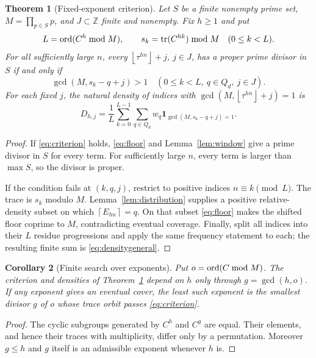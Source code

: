 \documentclass[11pt,a4paper]{article}
\newtheorem{theorem}{Theorem}[section]
\newtheorem{corollary}[theorem]{Corollary}
\theoremstyle{definition}\newtheorem{definition}[theorem]{Definition}
\theoremstyle{remark}\newtheorem{remark}[theorem]{Remark}
\newcommand{\Z}{\mathbb Z}\newcommand{\Q}{\mathbb Q}
\newcommand{\floor}[1]{\left\lfloor#1\right\rfloor}
\newcommand{\ceil}[1]{\left\lceil#1\right\rceil}
\newcommand{\ind}{\mathbf 1}
\begin{document}
\begin{theorem}[Fixed-exponent criterion]\label{thm:criterion}
Let $S$ be a finite nonempty prime set, $M=\prod_{p\in S}p$, and $J\subset\Z$ finite and nonempty. Fix $h\ge1$ and put
\[
 L=\operatorname{ord}(C^h\bmod M),\qquad
 s_k=\operatorname{tr}(C^{hk})\bmod M\quad(0\le k<L).
\]
For all sufficiently large $n$, every $\floor{\tau^{hn}}+j$, $j\in J$, has a proper prime divisor in $S$ if and only if
\begin{equation}\label{eq:criterion}
 \gcd(M,s_k-q+j)>1
 \quad(0\le k<L,\ q\in Q_d,\ j\in J).
\end{equation}
For each fixed $j$, the natural density of indices with
$\gcd(M,\floor{\tau^{hn}}+j)=1$ is
\begin{equation}\label{eq:densitygeneral}
 D_{h,j}=\frac1L\sum_{k=0}^{L-1}\sum_{q\in Q_d}
 w_q\ind_{\gcd(M,s_k-q+j)=1}.
\end{equation}
\end{theorem}
\begin{proof}
If \eqref{eq:criterion} holds, \eqref{eq:floor} and Lemma~\ref{lem:window} give a prime divisor in $S$ for every term. For sufficiently large $n$, every term is larger than $\max S$, so the divisor is proper.

If the condition fails at $(k,q,j)$, restrict to positive indices $n\equiv k\pmod L$. The trace is $s_k$ modulo $M$. Lemma~\ref{lem:distribution} supplies a positive relative-density subset on which $\ceil{E_{hn}}=q$. On that subset \eqref{eq:floor} makes the shifted floor coprime to $M$, contradicting eventual coverage. Finally, split all indices into their $L$ residue progressions and apply the same frequency statement to each; the resulting finite sum is \eqref{eq:densitygeneral}.
\end{proof}

\begin{corollary}[Finite search over exponents]\label{cor:search}
Put $o=\operatorname{ord}(C\bmod M)$. The criterion and densities of Theorem~\ref{thm:criterion} depend on $h$ only through $g=\gcd(h,o)$. If any exponent gives an eventual cover, the least such exponent is the smallest divisor $g$ of $o$ whose trace orbit passes \eqref{eq:criterion}.
\end{corollary}
\begin{proof}
The cyclic subgroups generated by $C^h$ and $C^g$ are equal. Their elements, and hence their traces with multiplicity, differ only by a permutation. Moreover $g\le h$ and $g$ itself is an admissible exponent whenever $h$ is.
\end{proof}
\end{document}
